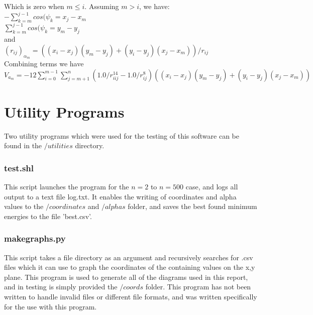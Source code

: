 \documentclass{report}
\begin{document}
\begin{appendix}
Which is zero when $m \leq i$. Assuming $m > i$, we have:\\

\( -\sum_{k=m}^{j-1}cos(\psi_{k} = x_{j} - x_{m}\)\\

\( \sum_{k=m}^{j-1}cos(\psi_{k} = y_{m} - y_{j}\)\\

and\\

\( (r_{ij})_{\alpha_{m}} = ((x_{i}-x_{j})(y_{m}-y_{j}) + (y_{i} - y_{j})(x_{j}-x_{m}))/r_{ij}\)\\

Combining terms we have\\

\( V_{a_{m}} = -12 \sum_{i=0}^{m-1}\sum_{j=m+1}^{n}(1.0/r_{iij}^{14}-1.0/r_{ij}^{8})((x_{i}-x_{j})(y_{m}-y_{j})+(y_{i}-y_{j})(x_{j}-x_{m}))\)\\

\section{Utility Programs}

Two utility programs which were used for the testing of this software can be found
in the $/utilities$ directory.

\subsubsection{test.shl}

This script launches the program for the $n = 2$ to $n = 500$ case, and logs all
output to a text file log.txt. It enables the writing of coordinates and alpha
values to the $/coordinates$ and $/alphas$ folder, and saves the best found 
minimum energies to the file 'best.csv'.

\subsubsection{makegraphs.py}

This script takes a file directory as an argument and recursively searches for .csv
files which it can use to graph the coordinates of the containing values on the x,y 
plane. This program is used to generate all of the diagrams used in this report, and
in testing is simply provided the $/coords$ folder. This program has not been written
to handle invalid files or different file formats, and was written specifically for 
the use with this program.


\end{appendix}
\end{document}
